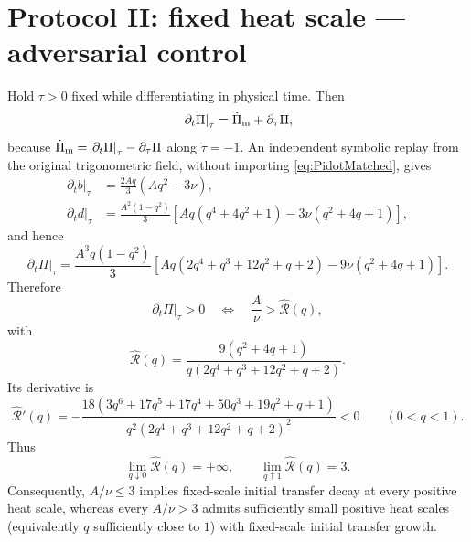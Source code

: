 \documentclass[11pt,a4paper]{article}
\begin{document}
\section{Protocol II: fixed heat scale --- adversarial control}
Hold $\tau>0$ fixed while differentiating in physical time. Then
\begin{equation}
 \left.\partial_t\Pi\right|_\tau
 =\dot\Pi_{\rm m}+\partial_\tau\Pi,
 \label{eq:chainrule}
\end{equation}
because $\dot\Pi_{\rm m}=\left.\partial_t\Pi\right|_\tau-\partial_\tau\Pi$ along $\dot\tau=-1$. An independent symbolic replay from the original trigonometric field, without importing \eqref{eq:PidotMatched}, gives
\begin{align}
 \left.\partial_t b\right|_\tau
 &=\frac{2Aq}{3}(Aq^2-3\nu),\\
 \left.\partial_t d\right|_\tau
 &=\frac{A^2(1-q^2)}{3}
 \left[Aq(q^4+4q^2+1)-3\nu(q^2+4q+1)\right],
\end{align}
and hence
\begin{equation}
 \boxed{\displaystyle
 \left.\partial_t\Pi\right|_\tau
 =\frac{A^3q(1-q^2)}{3}
 \left[Aq(2q^4+q^3+12q^2+q+2)-9\nu(q^2+4q+1)\right].}
 \label{eq:PidotFixed}
\end{equation}
Therefore
\begin{equation}
 \left.\partial_t\Pi\right|_\tau>0
 \quad\Longleftrightarrow\quad
 \frac{A}{\nu}>\widehat{\mathcal R}(q),
\end{equation}
with
\begin{equation}
 \boxed{\displaystyle
 \widehat{\mathcal R}(q)=
 \frac{9(q^2+4q+1)}{q(2q^4+q^3+12q^2+q+2)}.}
 \label{eq:Rhat}
\end{equation}
Its derivative is
\begin{equation}
 \widehat{\mathcal R}'(q)=
 -\frac{18(3q^6+17q^5+17q^4+50q^3+19q^2+q+1)}
 {q^2(2q^4+q^3+12q^2+q+2)^2}<0
 \qquad(0<q<1).
\end{equation}
Thus
\begin{equation}
 \lim_{q\downarrow0}\widehat{\mathcal R}(q)=+\infty,
 \qquad
 \lim_{q\uparrow1}\widehat{\mathcal R}(q)=3.
\end{equation}
Consequently, $A/\nu\le3$ implies fixed-scale initial transfer decay at every positive heat scale, whereas every $A/\nu>3$ admits sufficiently small positive heat scales (equivalently $q$ sufficiently close to $1$) with fixed-scale initial transfer growth.
\end{document}
